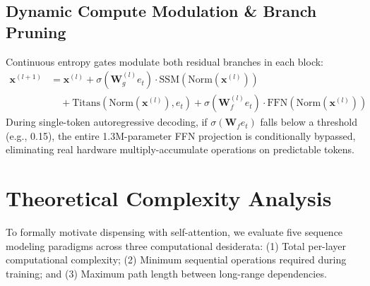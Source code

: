 \documentclass[10pt,twocolumn,letterpaper]{article}
\begin{document}
\subsection{Dynamic Compute Modulation \& Branch Pruning}
Continuous entropy gates modulate both residual branches in each block:
\begin{align}
    \mathbf{x}^{(l+1)} &= \mathbf{x}^{(l)} + \sigma(\mathbf{W}_g^{(l)} e_t) \cdot \text{SSM}(\text{Norm}(\mathbf{x}^{(l)})) \nonumber \\
    &\quad + \text{Titans}(\text{Norm}(\mathbf{x}^{(l)}), e_t) + \sigma(\mathbf{W}_f^{(l)} e_t) \cdot \text{FFN}(\text{Norm}(\mathbf{x}^{(l)}))
\end{align}
During single-token autoregressive decoding, if $\sigma(\mathbf{W}_f e_t)$ falls below a threshold (e.g., 0.15), the entire 1.3M-parameter FFN projection is conditionally bypassed, eliminating real hardware multiply-accumulate operations on predictable tokens.

\section{Theoretical Complexity Analysis}
\label{sec:complexity}

To formally motivate dispensing with self-attention, we evaluate five sequence modeling paradigms across three computational desiderata: (1) Total per-layer computational complexity; (2) Minimum sequential operations required during training; and (3) Maximum path length between long-range dependencies.
\end{document}
